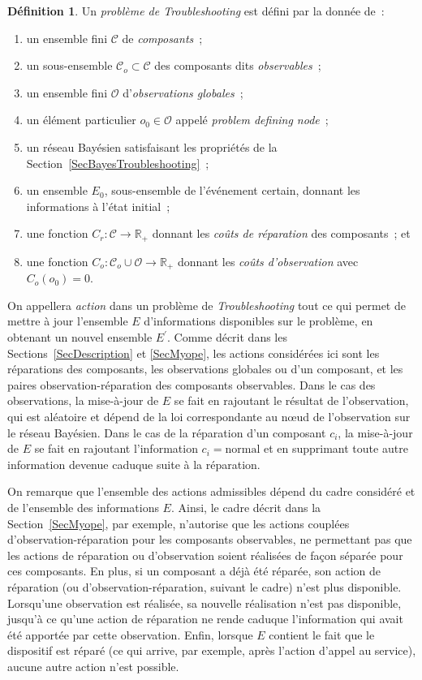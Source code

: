 \documentclass[a4paper,11pt]{article}
\theoremstyle{plain}
\theoremstyle{definition}
\newtheorem*{defi}{Définition}
\begin{document}
\begin{defi}
Un \emph{problème de Troubleshooting} est défini par la donnée de~:
\begin{enumerate}
\item un ensemble fini $\mathcal C$ de \emph{composants}~;
\item un sous-ensemble $\mathcal C_o \subset \mathcal C$ des composants dits \emph{observables}~;
\item un ensemble fini $\mathcal O$ d'\emph{observations globales}~;
\item un élément particulier $o_0 \in \mathcal O$ appelé \emph{problem defining node}~;
\item\label{Defi-Bayes} un réseau Bayésien satisfaisant les propriétés de la Section~\ref{SecBayesTroubleshooting}~;
\item un ensemble $E_0$, sous-ensemble de l'événement certain, donnant les informations à l'état initial~;
\item\label{Defi-CoutReparation} une fonction $C_r: \mathcal C \to \mathbb R_+$ donnant les \emph{coûts de réparation} des composants~; et
\item\label{Defi-CoutObservation} une fonction $C_o: \mathcal C_o \cup \mathcal O \to \mathbb R_+$ donnant les \emph{coûts d'observation} avec $C_o(o_0) = 0$.
\end{enumerate}
\end{defi}

On appellera \emph{action} dans un problème de \emph{Troubleshooting} tout ce qui permet de mettre à jour l'ensemble $E$ d'informations disponibles sur le problème, en obtenant un nouvel ensemble $E^\prime$. Comme décrit dans les Sections~\ref{SecDescription} et \ref{SecMyope}, les actions considérées ici sont les réparations des composants, les observations globales ou d'un composant, et les paires observation-réparation des composants observables. Dans le cas des observations, la mise-à-jour de $E$ se fait en rajoutant le résultat de l'observation, qui est aléatoire et dépend de la loi correspondante au nœud de l'observation sur le réseau Bayésien. Dans le cas de la réparation d'un composant $c_i$, la mise-à-jour de $E$ se fait en rajoutant l'information $c_i = \text{normal}$ et en supprimant toute autre information devenue caduque suite à la réparation.

On remarque que l'ensemble des actions admissibles dépend du cadre considéré et de l'ensemble des informations $E$. Ainsi, le cadre décrit dans la Section~\ref{SecMyope}, par exemple, n'autorise que les actions couplées d'observation-réparation pour les composants observables, ne permettant pas que les actions de réparation ou d'observation soient réalisées de façon séparée pour ces composants. En plus, si un composant a déjà été réparée, son action de réparation (ou d'observation-réparation, suivant le cadre) n'est plus disponible. Lorsqu'une observation est réalisée, sa nouvelle réalisation n'est pas disponible, jusqu'à ce qu'une action de réparation ne rende caduque l'information qui avait été apportée par cette observation. Enfin, lorsque $E$ contient le fait que le dispositif est réparé (ce qui arrive, par exemple, après l'action d'appel au service), aucune autre action n'est possible.
\end{document}
